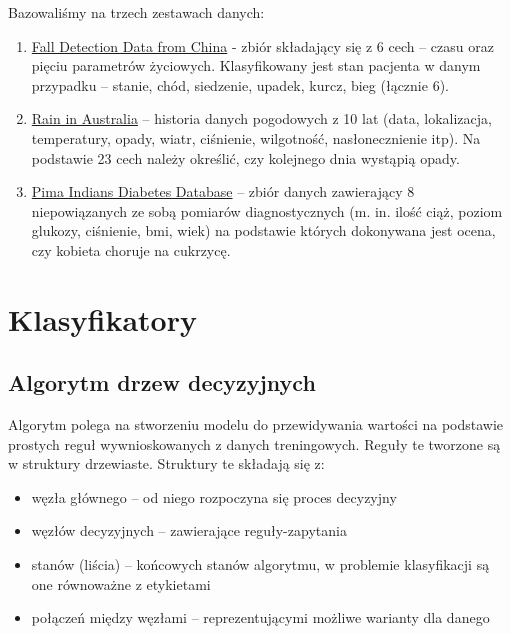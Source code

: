 \documentclass[a4paper,11pt]{article}
\begin{document}
Bazowaliśmy na trzech zestawach danych:

\begin{enumerate}[label=\Alph*.] \label{enum:datasets}
    \item{\href{https://www.kaggle.com/pitasr/falldata}{Fall Detection Data from China}} - zbiór składający się z 6 cech -- czasu oraz pięciu parametrów życiowych. Klasyfikowany jest stan pacjenta w danym przypadku -- stanie, chód, siedzenie, upadek, kurcz, bieg (łącznie 6).
    \item{\href{https://www.kaggle.com/jsphyg/weather-dataset-rattle-package}{Rain in Australia}} -- historia danych pogodowych z 10 lat (data, lokalizacja, temperatury, opady, wiatr, ciśnienie, wilgotność, nasłonecznienie itp). Na podstawie 23 cech należy określić, czy kolejnego dnia wystąpią opady.
    \item{\href{https://www.kaggle.com/uciml/pima-indians-diabetes-database}{Pima Indians Diabetes Database}} -- zbiór danych zawierający 8 niepowiązanych ze sobą pomiarów diagnostycznych (m. in. ilość ciąż, poziom glukozy, ciśnienie, bmi, wiek) na podstawie których dokonywana jest ocena, czy kobieta choruje na cukrzycę.
\end{enumerate}

\section{Klasyfikatory}

\subsection{Algorytm drzew decyzyjnych}
Algorytm polega na stworzeniu modelu do przewidywania wartości na podstawie prostych reguł wywnioskowanych z danych treningowych. Reguły te tworzone są w struktury drzewiaste. Struktury te składają się z:

\begin{itemize}
    \item węzła głównego -- od niego rozpoczyna się proces decyzyjny
    \item węzłów decyzyjnych -- zawierające reguły-zapytania
    \item stanów (liścia) -- końcowych stanów algorytmu, w problemie klasyfikacji są one równoważne z etykietami
    \item połączeń między węzłami -- reprezentującymi możliwe warianty dla danego
\end{itemize}
\end{document}
